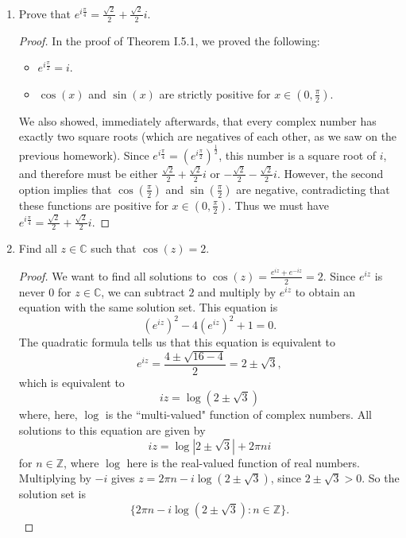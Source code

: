 \documentclass[10pt]{article}
\newcommand{\Z}{\mathbb{Z}}
\newcommand{\C}{\mathbb{C}}
\begin{document}
\begin{enumerate}
\item Prove that $e^{i\frac{\pi}{4}} = \frac{\sqrt{2}}{2} + \frac{\sqrt{2}}{2}i$.

\begin{proof}

In the proof of Theorem I.5.1, we proved the following:
\begin{itemize}
\item $e^{i\frac{\pi}{2}} = i$.
\item $\cos(x)$ and $\sin(x)$ are strictly positive for $x \in (0, \frac{\pi}{2})$.
\end{itemize}
We also showed, immediately afterwards, that every complex number has exactly two square roots (which are negatives of each other, as we saw on the previous homework).  Since $e^{i\frac{\pi}{4}} = (e^{i\frac{\pi}{2}})^{\frac12}$, this number is a square root of $i$, and therefore must be either $\frac{\sqrt{2}}{2} + \frac{\sqrt{2}}{2}i$ or $-\frac{\sqrt{2}}{2} - \frac{\sqrt{2}}{2}i$.  However, the second option implies that $\cos(\frac{\pi}{2})$ and $\sin(\frac{\pi}{2})$ are negative, contradicting that these functions are positive for $x \in (0,\frac{\pi}{2})$.  Thus we must have $e^{i\frac{\pi}{4}} = \frac{\sqrt{2}}{2} + \frac{\sqrt{2}}{2}i$.
\end{proof}











\item Find all $z \in \C$ such that $\cos(z) = 2$.

\begin{proof}

We want to find all solutions to $\cos(z) = \frac{e^{iz} + e^{-iz}}{2} = 2$.  Since $e^{iz}$ is never 0 for $z \in \C$, we can subtract $2$ and multiply by $e^{iz}$ to obtain an equation with the same solution set.  This equation is
$$
(e^{iz})^2 - 4(e^{iz})^2 + 1 = 0.
$$
The quadratic formula tells us that this equation is equivalent to
$$
e^{iz} = \frac{4 \pm \sqrt{16 - 4}}{2} = 2 \pm \sqrt{3},
$$
which is equivalent to
$$
iz = \log(2 \pm \sqrt{3})
$$
where, here, $\log$ is the ``multi-valued" function of complex numbers.  All solutions to this equation are given by
$$
iz = \log |2 \pm \sqrt{3} | + 2\pi n i
$$
for $n \in \Z$, where $\log$ here is the real-valued function of real numbers.  Multiplying by $-i$ gives $z = 2\pi n - i \log (2 \pm \sqrt{3})$, since $2 \pm \sqrt{3} > 0$.  So the solution set is
$$
\{ 2\pi n - i \log (2 \pm \sqrt{3}) : n \in \Z \}.
$$
\end{proof}





\end{enumerate}
\end{document}
